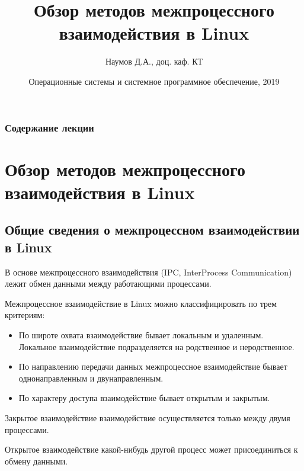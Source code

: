\documentclass{beamer}
\title[Межпроцессное взаимодействие]{Обзор методов межпроцессного взаимодействия в Linux}
\author{Наумов Д.А., доц. каф. КТ}
\date[26.11.2019] {Операционные системы и системное программное обеспечение, 2019}
\begin{document}
\begin{frame}
  \titlepage
\end{frame}
  
\begin{frame}
  \frametitle{Содержание лекции}
  \tableofcontents  
\end{frame}

\section{Обзор методов межпроцессного взаимодействия в Linux}

\subsection{Общие сведения о межпроцессном взаимодействии в Linux}

\begin{frame}
В основе межпроцессного взаимодействия (IPC, InterProcess Communication) лежит обмен данными между работающими процессами. 

Межпроцессное взаимодействие в Linux можно классифицировать по трем критериям:
\begin{itemize}
\item По широте охвата взаимодействие бывает локальным и удаленным. Локальное
взаимодействие подразделяется на родственное и неродственное.
\item По направлению передачи данных межпроцессное взаимодействие бывает однонаправленным и двунаправленным.
\item По характеру доступа взаимодействие бывает открытым и закрытым.
\end{itemize}
\begin{block}{Закрытое взаимодействие}
взаимодействие осуществляется только между двумя процессами.
\end{block}
\begin{block}{Открытое взаимодействие}
какой-нибудь другой процесс может присоединиться к обмену данными.
\end{block}
\end{frame}
\end{document}
